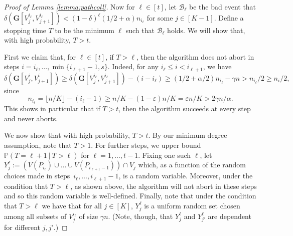 \documentclass[11pt, dvipsnames]{amsart}
\theoremstyle{plain}
\theoremstyle{definition}
\newcommand{\eps}{\varepsilon}
\begin{document}
\begin{proof}[Proof of Lemma \ref{lemma:pathcoll}]
Now for $\ell\in [t]$,
 let 
$\mathcal{B}_\ell$ be the bad event that $\delta(\mathbf{G}[V_j^{i_\ell},V_{j+1}^{i_\ell}])<(1-\delta)^\ell(1/2+\alpha)n_{i_\ell}$ for some $j \in [K-1]$.
Define a stopping time $T$ to be the minimum $\ell$ such that $\mathcal{B}_\ell$ holds. We will show that, with high probability, $T>t$.



First we claim that, for $\ell\in [t]$, if $T>\ell$, then the algorithm does not abort in steps $i=i_\ell,\ldots,\min\{i_{\ell+1}-1,s\}$.
Indeed, for any $i_\ell \leq i < i_{\ell+1}$, we have
    \begin{equation*}
\delta(\mathbf{G}[V_j^i,V_{j+1}^i]) \geq  \delta(\mathbf{G}[V_j^{i_\ell},V_{j+1}^{i_\ell}])-(i-i_\ell) \geq (1/2+\alpha/2)n_{i_\ell}-\gamma n>
n_{i_\ell}/2 \geq n_i/2,
\end{equation*} 
since 
\begin{equation} \label{eq:ni}
n_{i_\ell} = \lfloor n/K\rfloor - (i_\ell-1) \geq n/K - (1-\eps)n/K = \eps n/K > 2\gamma n/\alpha.    \end{equation}
This shows in particular that if $T>t$, then the algorithm succeeds at every step and never aborts.

    We now show that with high probability, $T>t$. By our minimum degree assumption, note that $T>1$. For further steps, we upper bound $\mathbb{P}(T=\ell+1 \ | \ T>\ell)$ for $\ell=1,\ldots,t-1$.  Fixing one such $\ell$, 
let $Y^\ell_j := (V(P_{i_\ell}) \cup \ldots \cup V(P_{i_{\ell+1}-1})) \cap V_j$ which, as a function of the random choices made in steps~$i_\ell,\ldots, i_{\ell+1}-1$,
is a random variable. Moreover, under the condition that $T>\ell$, as shown above, the algorithm will not abort in these steps and so this random variable is well-defined. 
Finally, note that under the condition that $T>\ell$ we have that for all $j \in [K]$,  $Y^\ell_j$ is a uniform random set chosen among all subsets of $V_j^{i_\ell}$ of size $\gamma n$.
(Note, though, that $Y^\ell_j$ and $Y^\ell_{j'}$ are dependent for different $j,j'$.)


\end{proof}
\end{document}
